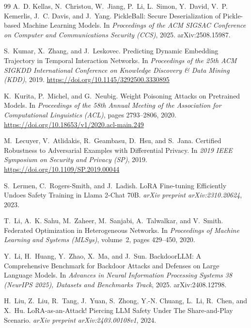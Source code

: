 \documentclass[11pt]{article}
\theoremstyle{plain}
\theoremstyle{definition}
\theoremstyle{remark}
\begin{document}
\begin{thebibliography}{99}
A.~D. Kellas, N.~Christou, W.~Jiang, P.~Li, L.~Simon, Y.~David, V.~P. Kemerlis, J.~C. Davis, and J.~Yang.
\newblock PickleBall: Secure Deserialization of Pickle-based Machine Learning Models.
\newblock In \emph{Proceedings of the ACM SIGSAC Conference on Computer and Communications Security (CCS)}, 2025.
\newblock arXiv:2508.15987.

S.~Kumar, X.~Zhang, and J.~Leskovec.
\newblock Predicting Dynamic Embedding Trajectory in Temporal Interaction Networks.
\newblock In \emph{Proceedings of the 25th ACM SIGKDD International Conference on Knowledge Discovery \& Data Mining (KDD)}, 2019.
\newblock \url{https://doi.org/10.1145/3292500.3330895}

K.~Kurita, P.~Michel, and G.~Neubig.
\newblock Weight Poisoning Attacks on Pretrained Models.
\newblock In \emph{Proceedings of the 58th Annual Meeting of the Association for Computational Linguistics (ACL)}, pages 2793--2806, 2020.
\newblock \url{https://doi.org/10.18653/v1/2020.acl-main.249}

M.~Lecuyer, V.~Atlidakis, R.~Geambasu, D.~Hsu, and S.~Jana.
\newblock Certified Robustness to Adversarial Examples with Differential Privacy.
\newblock In \emph{2019 IEEE Symposium on Security and Privacy (SP)}, 2019.
\newblock \url{https://doi.org/10.1109/SP.2019.00044}

S.~Lermen, C.~Rogers-Smith, and J.~Ladish.
\newblock LoRA Fine-tuning Efficiently Undoes Safety Training in Llama 2-Chat 70B.
\newblock \emph{arXiv preprint arXiv:2310.20624}, 2023.

T.~Li, A.~K. Sahu, M.~Zaheer, M.~Sanjabi, A.~Talwalkar, and V.~Smith.
\newblock Federated Optimization in Heterogeneous Networks.
\newblock In \emph{Proceedings of Machine Learning and Systems (MLSys)}, volume~2, pages 429--450, 2020.

Y.~Li, H.~Huang, Y.~Zhao, X.~Ma, and J.~Sun.
\newblock BackdoorLLM: A Comprehensive Benchmark for Backdoor Attacks and Defenses on Large Language Models.
\newblock In \emph{Advances in Neural Information Processing Systems 38 (NeurIPS 2025), Datasets and Benchmarks Track}, 2025.
\newblock arXiv:2408.12798.

H.~Liu, Z.~Liu, R.~Tang, J.~Yuan, S.~Zhong, Y.-N. Chuang, L.~Li, R.~Chen, and X.~Hu.
\newblock LoRA-as-an-Attack! Piercing LLM Safety Under The Share-and-Play Scenario.
\newblock \emph{arXiv preprint arXiv:2403.00108v1}, 2024.


\end{thebibliography}
\end{document}
